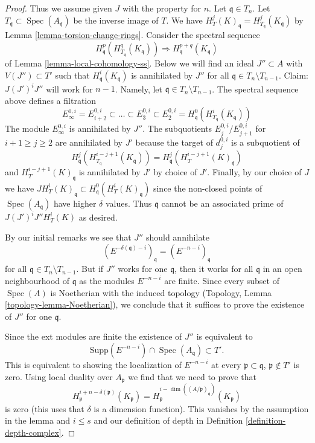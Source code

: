 \documentclass{stacks-project}
\theoremstyle{plain}
\theoremstyle{definition}
\theoremstyle{remark}
\numberwithin{equation}{subsection}
\def\Spec{\mathop{\mathrm{Spec}}}
\begin{document}
\begin{proof}
\medskip\noindent
Thus we assume given $J$ with the property for $n$.
Let $\mathfrak q \in T_n$. Let $T_\mathfrak q \subset \Spec(A_\mathfrak q)$
be the inverse image of $T$. We have
$H^j_T(K)_\mathfrak q = H^j_{T_\mathfrak q}(K_\mathfrak q)$
by Lemma \ref{lemma-torsion-change-rings}.
Consider the spectral sequence
$$
H_\mathfrak q^p(H^q_{T_\mathfrak q}(K_\mathfrak q))
\Rightarrow
H^{p + q}_\mathfrak q(K_\mathfrak q)
$$
of Lemma \ref{lemma-local-cohomology-ss}.
Below we will find an ideal $J'' \subset A$ with $V(J'') \subset T'$
such that $H^i_\mathfrak q(K_\mathfrak q)$ is annihilated by $J''$ for all
$\mathfrak q \in T_n \setminus T_{n - 1}$.
Claim: $J (J')^i J''$ will work for $n - 1$.
Namely, let $\mathfrak q \in T_n \setminus T_{n - 1}$.
The spectral sequence above defines a filtration
$$
E_\infty^{0, i} = E_{i + 2}^{0, i} \subset \ldots \subset E_3^{0, i} \subset
E_2^{0, i} = H^0_\mathfrak q(H^i_{T_\mathfrak q}(K_\mathfrak q))
$$
The module $E_\infty^{0, i}$ is annihilated by $J''$.
The subquotients $E_j^{0, i}/E_{j + 1}^{0, i}$ for $i + 1 \geq j \geq 2$
are annihilated by $J'$ because the target of $d_j^{0, i}$
is a subquotient of
$$
H^j_\mathfrak q(H^{i - j + 1}_{T_\mathfrak q}(K_\mathfrak q)) =
H^j_\mathfrak q(H^{i - j + 1}_T(K)_\mathfrak q)
$$
and $H^{i - j + 1}_T(K)_\mathfrak q$ is annihilated by $J'$ by choice of $J'$.
Finally, by our choice of $J$ we have
$J H^i_T(K)_\mathfrak q \subset H^0_\mathfrak q(H^i_T(K)_\mathfrak q)$
since the non-closed points of $\Spec(A_\mathfrak q)$ have higher
$\delta$ values. Thus $\mathfrak q$ cannot be an associated prime of
$J(J')^iJ'' H^i_T(K)$ as desired.

\medskip\noindent
By our initial remarks we see that $J''$ should annihilate
$$
(E^{-\delta(\mathfrak q) - i})_\mathfrak q =
(E^{-n - i})_\mathfrak q
$$
for all $\mathfrak q \in T_n \setminus T_{n - 1}$.
But if $J''$ works for one $\mathfrak q$, then it works for all
$\mathfrak q$ in an open neighbourhood of $\mathfrak q$
as the modules $E^{-n - i}$ are finite.
Since every subset of $\Spec(A)$ is Noetherian with the induced
topology (Topology, Lemma \ref{topology-lemma-Noetherian}),
we conclude that it suffices
to prove the existence of $J''$ for one $\mathfrak q$.

\medskip\noindent
Since the ext modules are finite the existence of $J''$ is
equivalent to
$$
\text{Supp}(E^{-n - i}) \cap \Spec(A_\mathfrak q) \subset T'.
$$
This is equivalent to showing the localization of $E^{-n - i}$ at every
$\mathfrak p \subset \mathfrak q$, $\mathfrak p \not \in T'$
is zero. Using local duality over $A_\mathfrak p$ we find that we need
to prove that
$$
H^{i + n - \delta(\mathfrak p)}_\mathfrak p(K_\mathfrak p) =
H^{i - \dim((A/\mathfrak p)_\mathfrak q)}_\mathfrak p(K_\mathfrak p)
$$
is zero (this uses that $\delta$ is a dimension function).
This vanishes by the assumption in the lemma and $i \leq s$ and
our definition of depth in Definition \ref{definition-depth-complex}.


\end{proof}
\end{document}
